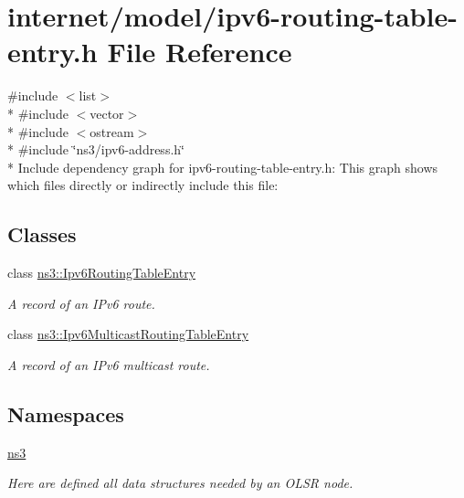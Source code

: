 \hypertarget{ipv6-routing-table-entry_8h}{}\section{internet/model/ipv6-\/routing-\/table-\/entry.h File Reference}
\label{ipv6-routing-table-entry_8h}
{\ttfamily \#include $<$list$>$}\\*
{\ttfamily \#include $<$vector$>$}\\*
{\ttfamily \#include $<$ostream$>$}\\*
{\ttfamily \#include \char`\"{}ns3/ipv6-\/address.\+h\char`\"{}}\\*
Include dependency graph for ipv6-\/routing-\/table-\/entry.h\+:
This graph shows which files directly or indirectly include this file\+:
\subsection*{Classes}
\begin{DoxyCompactItemize}
\item 
class \hyperlink{classns3_1_1Ipv6RoutingTableEntry}{ns3\+::\+Ipv6\+Routing\+Table\+Entry}
\begin{DoxyCompactList}\small\item\em A record of an I\+Pv6 route. \end{DoxyCompactList}\item 
class \hyperlink{classns3_1_1Ipv6MulticastRoutingTableEntry}{ns3\+::\+Ipv6\+Multicast\+Routing\+Table\+Entry}
\begin{DoxyCompactList}\small\item\em A record of an I\+Pv6 multicast route. \end{DoxyCompactList}\end{DoxyCompactItemize}
\subsection*{Namespaces}
\begin{DoxyCompactItemize}
\item 
 \hyperlink{namespacens3}{ns3}
\begin{DoxyCompactList}\small\item\em Here are defined all data structures needed by an O\+L\+SR node. \end{DoxyCompactList}\end{DoxyCompactItemize}

